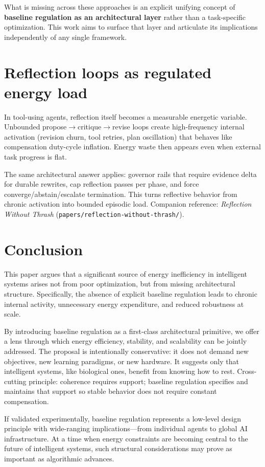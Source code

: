 \documentclass[11pt]{article}
\begin{document}
What is missing across these approaches is an explicit unifying concept of \textbf{baseline regulation as an architectural layer} rather than a task-specific optimization. This work aims to surface that layer and articulate its implications independently of any single framework.

\section{Reflection loops as regulated energy load}
In tool-using agents, reflection itself becomes a measurable energetic variable. Unbounded propose\(\rightarrow\)critique\(\rightarrow\)revise loops create high-frequency internal activation (revision churn, tool retries, plan oscillation) that behaves like compensation duty-cycle inflation. Energy waste then appears even when external task progress is flat.

The same architectural answer applies: governor rails that require evidence delta for durable rewrites, cap reflection passes per phase, and force converge/abstain/escalate termination. This turns reflective behavior from chronic activation into bounded episodic load. Companion reference: \emph{Reflection Without Thrash} (\texttt{papers/reflection-without-thrash/}).

\section{Conclusion}
This paper argues that a significant source of energy inefficiency in intelligent systems arises not from poor optimization, but from missing architectural structure. Specifically, the absence of explicit baseline regulation leads to chronic internal activity, unnecessary energy expenditure, and reduced robustness at scale. 

By introducing baseline regulation as a first-class architectural primitive, we offer a lens through which energy efficiency, stability, and scalability can be jointly addressed. The proposal is intentionally conservative: it does not demand new objectives, new learning paradigms, or new hardware. It suggests only that intelligent systems, like biological ones, benefit from knowing how to rest. 
Cross-cutting principle: coherence requires support; baseline regulation specifies and maintains that support so stable behavior does not require constant compensation.

If validated experimentally, baseline regulation represents a low-level design principle with wide-ranging implications—from individual agents to global AI infrastructure. At a time when energy constraints are becoming central to the future of intelligent systems, such structural considerations may prove as important as algorithmic advances.
\end{document}
